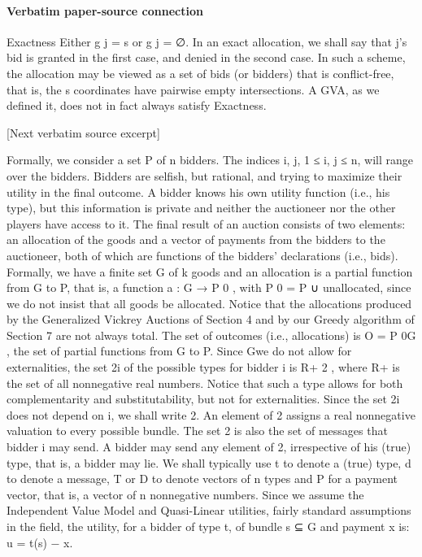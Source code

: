 \documentclass[10pt]{article}
\begin{document}
\paragraph{Verbatim paper-source connection}
\begin{ReviewVerbatim}
Exactness Either g j = s or g j = ∅.
In an exact allocation, we shall say that j’s bid is granted in the first case, and denied
in the second case. In such a scheme, the allocation may be viewed as a set of bids
(or bidders) that is conflict-free, that is, the s coordinates have pairwise empty
intersections. A GVA, as we defined it, does not in fact always satisfy Exactness.

[Next verbatim source excerpt]

Formally, we consider a set P of n bidders. The indices i, j, 1 ≤ i, j ≤ n, will
range over the bidders. Bidders are selfish, but rational, and trying to maximize their
utility in the final outcome. A bidder knows his own utility function (i.e., his type),
but this information is private and neither the auctioneer nor the other players have
access to it. The final result of an auction consists of two elements: an allocation
of the goods and a vector of payments from the bidders to the auctioneer, both of
which are functions of the bidders’ declarations (i.e., bids). Formally, we have a
finite set G of k goods and an allocation is a partial function from G to P, that is, a
function a : G → P 0 , with P 0 = P ∪ {unallocated}, since we do not insist that all
goods be allocated. Notice that the allocations produced by the Generalized Vickrey
Auctions of Section 4 and by our Greedy algorithm of Section 7 are not always
total. The set of outcomes (i.e., allocations) is O = P 0G , the set of partial functions
from G to P. Since Gwe do not allow for externalities, the set 2i of the possible types
for bidder i is R+ 2 , where R+ is the set of all nonnegative real numbers. Notice
that such a type allows for both complementarity and substitutability, but not for
externalities. Since the set 2i does not depend on i, we shall write 2. An element
of 2 assigns a real nonnegative valuation to every possible bundle. The set 2 is
also the set of messages that bidder i may send. A bidder may send any element of
2, irrespective of his (true) type, that is, a bidder may lie. We shall typically use t
to denote a (true) type, d to denote a message, T or D to denote vectors of n types
and P for a payment vector, that is, a vector of n nonnegative numbers.
Since we assume the Independent Value Model and Quasi-Linear utilities, fairly
standard assumptions in the field, the utility, for a bidder of type t, of bundle s ⊆ G
and payment x is:
u = t(s) − x.


\end{ReviewVerbatim}
\end{document}
